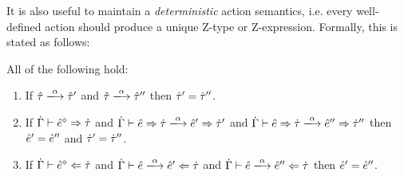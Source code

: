 It is also useful to maintain a \emph{deterministic} action semantics, i.e. every well-defined action should produce a unique Z-type or Z-expression. Formally, this is stated as follows:
\begin{theorem} All of the following hold:
\label{thrm:actdet}
\begin{enumerate}
\item If $\performTyp{\ztau}{\alpha}{\ztau'}$ and $\performTyp{\ztau}{\alpha}{\ztau''}$ then $\hat{\tau}'=\hat{\tau}''$.
\item If $\dot{\Gamma} \vdash \hat{e}^{\diamond} \Rightarrow \dot{\tau}$ and
  $\performSyn{\hGamma}{\zexp}{\htau}{\alpha}{\zexp'}{\htau'}$ and
  $\performSyn{\hGamma}{\zexp}{\htau}{\alpha}{\zexp''}{\htau''}$ then
  $\hat{e}' = \hat{e}''$ and $\dot{\tau}' = \dot{\tau}''$.

\item If $\dot{\Gamma} \vdash \hat{e}^{\diamond} \Leftarrow \dot{\tau}$ and
  $\performAna{\hGamma}{\zexp}{\htau}{\alpha}{\zexp'}$ and
  $\performAna{\hGamma}{\zexp}{\htau}{\alpha}{\zexp''}$ then $\hat{e}' =
  \hat{e}''$.
\end{enumerate}
\end{theorem}

